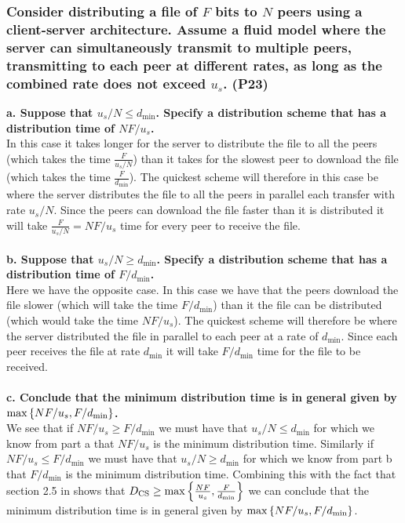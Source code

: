 \subsubsection{Consider distributing a file of $F$ bits to $N$ peers using a client-server architecture. Assume a fluid model where the server can simultaneously transmit to multiple peers, transmitting to each peer at different rates, as long as the combined rate does not exceed $u_s$. (P23)}

\textbf{a. Suppose that $u_s / N \leq d_\text{min}$. Specify a distribution scheme that has a distribution time of $NF/u_s$.} \\
In this case it takes longer for the server to distribute the file to all the peers (which takes the time $\frac{F}{u_s/N}$) than it takes for the slowest peer to download the file (which takes the time $\frac{F}{d_\text{min}}$). The quickest scheme will therefore in this case be where the server distributes the file to all the peers in parallel each transfer with rate $u_s/N$. Since the peers can download the file faster than it is distributed it will take $\frac{F}{u_s/N} = NF/u_s$ time for every peer to receive the file. \\
\\
\textbf{b. Suppose that $u_s / N \geq d_\text{min}$. Specify a distribution scheme that has a distribution time of $F / d_\text{min}$.} \\
Here we have the opposite case. In this case we have that the peers download the file slower (which will take the time $F/d_\text{min}$) than it the file can be distributed (which would take the time $NF/u_s$). The quickest scheme will therefore be where the server distributed the file in parallel to each peer at a rate of $d_\text{min}$. Since each peer receives the file at rate $d_\text{min}$ it will take $F/d_\text{min}$ time for the file to be received. \\
\\
\textbf{c. Conclude that the minimum distribution time is in general given by $\max \left \{NF/u_s, F/d_\text{min}\right\}$.} \\
We see that if $NF/u_s \geq F/d_\text{min}$ we must have that $u_s / N \leq d_\text{min}$ for which we know from part a that $NF/u_s$ is the minimum distribution time. Similarly if $NF/u_s \leq F/d_\text{min}$ we must have that $u_s / N \geq d_\text{min}$ for which we know from part b that $F/d_\text{min}$ is the minimum distribution time. Combining this with the fact that section 2.5 in \cite{kr} shows that $D_{\text{CS}} \geq \max \left \{\frac{NF}{u_s} , \frac{F}{d_{\text{min}}}\right\}$ we can conclude that the minimum distribution time is in general given by $\max \left \{NF/u_s, F/d_\text{min}\right\}$. \\


